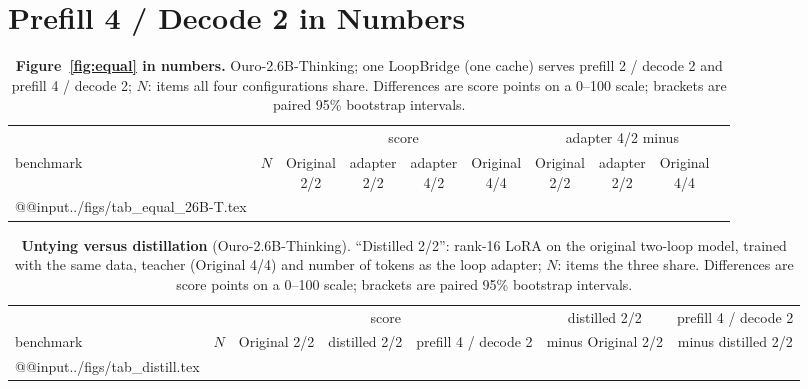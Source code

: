 \documentclass[11pt]{article}
\begin{document}
\FloatBarrier
\section{Prefill 4 / Decode 2 in Numbers}
\label{app:t14}

\begin{table}[t]
\centering\footnotesize
\setlength\tabcolsep{3pt}
\begin{tabular}{@{}lrcccccccc@{}}
\toprule
 & & \multicolumn{4}{c}{score} & \multicolumn{3}{c}{adapter 4/2 minus} \\
\cmidrule(lr){3-6}\cmidrule(l){7-9}
benchmark & $N$ & \shortstack{Original\\2/2} & \shortstack{adapter\\2/2} & \shortstack{adapter\\4/2} & \shortstack{Original\\4/4} & \shortstack{Original\\2/2} & \shortstack{adapter\\2/2} & \shortstack{Original\\4/4} \\
\midrule
\csname @@input\endcsname ../figs/tab_equal_26B-T.tex
\bottomrule
\end{tabular}
\caption{\textbf{Figure~\ref{fig:equal} in numbers.} Ouro-2.6B-Thinking; one LoopBridge (one cache) serves prefill 2 /
decode 2 and prefill 4 / decode 2; $N$: items all four configurations share. Differences are score points on a
0--100 scale;
brackets are paired 95\% bootstrap intervals.}
\label{tab:t14}
\end{table}

\begin{table}[t]
\centering\small
\setlength\tabcolsep{4pt}
\begin{tabular}{@{}lrccccc@{}}
\toprule
 & & \multicolumn{3}{c}{score} & distilled 2/2 & prefill 4 / decode 2 \\
benchmark & $N$ & Original 2/2 & distilled 2/2 & prefill 4 / decode 2 & minus Original 2/2 & minus distilled 2/2 \\
\midrule
\csname @@input\endcsname ../figs/tab_distill.tex
\bottomrule
\end{tabular}
\caption{\textbf{Untying versus distillation} (Ouro-2.6B-Thinking). ``Distilled 2/2'': rank-16 LoRA on the original
two-loop model, trained with the same data, teacher (Original 4/4) and number of tokens as the loop adapter; $N$: items
the three share. Differences
are score points on a 0--100 scale; brackets are paired 95\% bootstrap intervals.}
\label{tab:distill}
\end{table}
\end{document}
